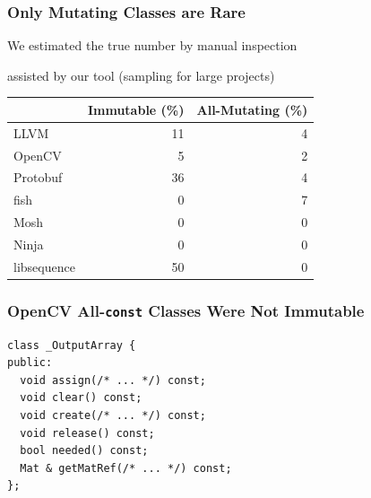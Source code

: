 \documentclass[aspectratio=169]{beamer}
\begin{document}
  \begin{frame}
    \frametitle{Only Mutating Classes are Rare}

    We estimated the true number by manual inspection

    \hspace{1em} assisted by our tool (sampling for large projects)

    \vspace{2em}

    \begin{center}\begin{tabular}{l r r}
                  & Immutable (\%) & All-Mutating (\%) \\
      \hline
      LLVM        & 11 & 4 \\
      OpenCV      &  5 & 2 \\
      Protobuf    & 36 & 4 \\
      fish        &  0 & 7 \\
      Mosh        &  0 & 0 \\
      Ninja       &  0 & 0 \\
      libsequence & 50 & 0 \\
    \end{tabular}\end{center}
  \end{frame}

  \begin{frame}[fragile]
    \frametitle{OpenCV All-\texttt{const} Classes Were Not Immutable}

    \begin{lstlisting}
class _OutputArray {
public:
  void assign(/* ... */) const;
  void clear() const;
  void create(/* ... */) const;
  void release() const;
  bool needed() const;
  Mat & getMatRef(/* ... */) const;
};
    \end{lstlisting}
  \end{frame}
\end{document}
